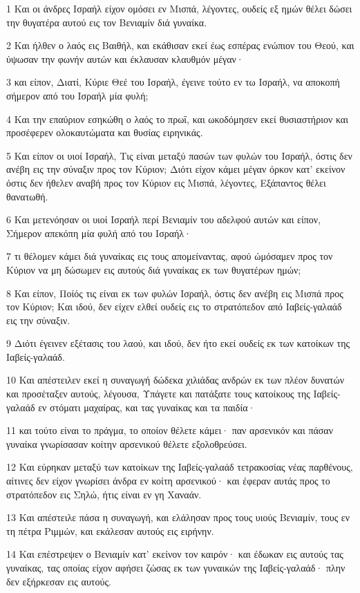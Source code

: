 \par 1 Και οι άνδρες Ισραήλ είχον ομόσει εν Μισπά, λέγοντες, ουδείς εξ ημών θέλει δώσει την θυγατέρα αυτού εις τον Βενιαμίν διά γυναίκα.
\par 2 Και ήλθεν ο λαός εις Βαιθήλ, και εκάθισαν εκεί έως εσπέρας ενώπιον του Θεού, και ύψωσαν την φωνήν αυτών και έκλαυσαν κλαυθμόν μέγαν·
\par 3 και είπον, Διατί, Κύριε Θεέ του Ισραήλ, έγεινε τούτο εν τω Ισραήλ, να αποκοπή σήμερον από του Ισραήλ μία φυλή;
\par 4 Και την επαύριον εσηκώθη ο λαός το πρωΐ, και ωκοδόμησεν εκεί θυσιαστήριον και προσέφερεν ολοκαυτώματα και θυσίας ειρηνικάς.
\par 5 Και είπον οι υιοί Ισραήλ, Τις είναι μεταξύ πασών των φυλών του Ισραήλ, όστις δεν ανέβη εις την σύναξιν προς τον Κύριον; Διότι είχον κάμει μέγαν όρκον κατ' εκείνον όστις δεν ήθελεν αναβή προς τον Κύριον εις Μισπά, λέγοντες, Εξάπαντος θέλει θανατωθή.
\par 6 Και μετενόησαν οι υιοί Ισραήλ περί Βενιαμίν του αδελφού αυτών και είπον, Σήμερον απεκόπη μία φυλή από του Ισραήλ·
\par 7 τι θέλομεν κάμει διά γυναίκας εις τους απομείναντας, αφού ώμόσαμεν προς τον Κύριον να μη δώσωμεν εις αυτούς διά γυναίκας εκ των θυγατέρων ημών;
\par 8 Και είπον, Ποίός τις είναι εκ των φυλών Ισραήλ, όστις δεν ανέβη εις Μισπά προς τον Κύριον; Και ιδού, δεν είχεν ελθεί ουδείς εις το στρατόπεδον από Ιαβείς-γαλαάδ εις την σύναξιν.
\par 9 Διότι έγεινεν εξέτασις του λαού, και ιδού, δεν ήτο εκεί ουδείς εκ των κατοίκων της Ιαβείς-γαλαάδ.
\par 10 Και απέστειλεν εκεί η συναγωγή δώδεκα χιλιάδας ανδρών εκ των πλέον δυνατών και προσέταξεν αυτούς, λέγουσα, Υπάγετε και πατάξατε τους κατοίκους της Ιαβείς-γαλαάδ εν στόματι μαχαίρας, και τας γυναίκας και τα παιδία·
\par 11 και τούτο είναι το πράγμα, το οποίον θέλετε κάμει· παν αρσενικόν και πάσαν γυναίκα γνωρίσασαν κοίτην αρσενικού θέλετε εξολοθρεύσει.
\par 12 Και εύρηκαν μεταξύ των κατοίκων της Ιαβείς-γαλαάδ τετρακοσίας νέας παρθένους, αίτινες δεν είχον γνωρίσει άνδρα εν κοίτη αρσενικού· και έφεραν αυτάς προς το στρατόπεδον εις Σηλώ, ήτις είναι εν γη Χαναάν.
\par 13 Και απέστειλε πάσα η συναγωγή, και ελάλησαν προς τους υιούς Βενιαμίν, τους εν τη πέτρα Ριμμών, και εκάλεσαν αυτούς εις ειρήνην.
\par 14 Και επέστρεψεν ο Βενιαμίν κατ' εκείνον τον καιρόν· και έδωκαν εις αυτούς τας γυναίκας, τας οποίας είχον αφήσει ζώσας εκ των γυναικών της Ιαβείς-γαλαάδ· πλην δεν εξήρκεσαν εις αυτούς.
